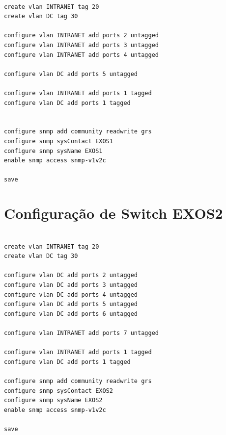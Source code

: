 \begin{listing}[H]
\centering
\begin{verbatim}

create vlan INTRANET tag 20
create vlan DC tag 30

configure vlan INTRANET add ports 2 untagged
configure vlan INTRANET add ports 3 untagged
configure vlan INTRANET add ports 4 untagged

configure vlan DC add ports 5 untagged

configure vlan INTRANET add ports 1 tagged
configure vlan DC add ports 1 tagged


configure snmp add community readwrite grs
configure snmp sysContact EXOS1
configure snmp sysName EXOS1
enable snmp access snmp-v1v2c 

save 

\end{verbatim}
\caption{Configuração de Switch EXOS1}
\label{lst:exos1}
\end{listing}

\section{Configuração de Switch EXOS2}

\begin{listing}[H]
\centering
\begin{verbatim}

create vlan INTRANET tag 20
create vlan DC tag 30

configure vlan DC add ports 2 untagged
configure vlan DC add ports 3 untagged
configure vlan DC add ports 4 untagged
configure vlan DC add ports 5 untagged
configure vlan DC add ports 6 untagged

configure vlan INTRANET add ports 7 untagged

configure vlan INTRANET add ports 1 tagged
configure vlan DC add ports 1 tagged

configure snmp add community readwrite grs
configure snmp sysContact EXOS2
configure snmp sysName EXOS2
enable snmp access snmp-v1v2c 

save 



\end{verbatim}
\caption{Configuração de Switch EXOS2}
\label{lst:exos2}
\end{listing}

